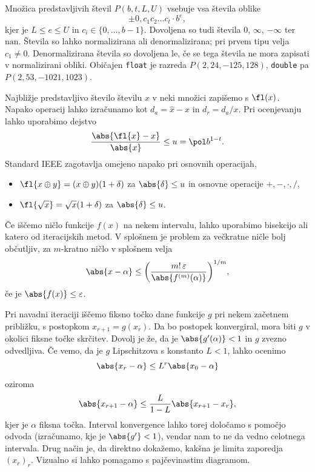 
\newcommand{\nan}{\text{nan}}

Množica predstavljivih števil $P(b, t, L, U)$ vsebuje vsa števila oblike
\[
  \pm 0, c_1 c_2 \ldots c_t \cdot b^e,
\]
kjer je $L \le e \le U$ in $c_i \in \{0, \ldots, b-1\}$.
Dovoljena so tudi števila $0$, $\infty$, $-\infty$ ter $\nan$.
Števila so lahko normalizirana ali denormalizirana; pri prvem tipu velja $c_1
\ne 0$.
Denormalizirana števila so dovoljena le, če se tega števila ne mora zapisati v
normalizirani obliki.
Običajen \verb+float+ je razreda $P(2, 24, -125, 128)$, \verb+double+ pa $P(2,
53, -1021, 1023)$.

Najbližje predstavljivo število številu $x$ v neki množici zapišemo s $\fl(x)$.
Napako operacij lahko izračunamo kot  $d_a = \hat{x} -
x$ in  $d_r = d_a / x$.
Pri ocenjevanju lahko uporabimo dejstvo
\[
  \frac{\abs{\fl{x} - x}}{\abs{x}} \le u = \pol b^{1-t}.
\]
Standard IEEE zagotavlja omejeno napako pri osnovnih operacijah,
\begin{itemize}
\item $\fl{x \oplus y} = (x \oplus y)(1+\delta)$ za $\abs{\delta} \le u$ in
  osnovne operacije $+, -, \cdot, /$,
\item $\fl{\sqrt{x}} = \sqrt{x} (1+\delta)$ za $\abs{\delta} \le u$.
\end{itemize}


Če iščemo ničlo funkcije $f(x)$ na nekem intervalu, lahko uporabimo bisekcijo
ali katero od iteracijskih metod.
V splošnem je problem za večkratne ničle bolj občutljiv, za $m$-kratno ničlo v
splošnem velja
\[
  \abs{x - \alpha} \le {\left( \frac{m!\,\varepsilon}{\abs{f^{(m)}(\alpha)}}
  \right)}^{1/m},
\]
če je $\abs{f(x)} \le \varepsilon$.

Pri navadni iteraciji iščemo fiksno točko dane funkcije $g$ pri nekem začetnem
približku, s postopkom $x_{r+1} = g(x_r)$.
Da bo postopek konvergiral, mora biti $g$ v okolici fiksne točke skrčitev.
Dovolj je že, da je $\abs{g'(\alpha)} < 1$ in $g$ zvezno odvedljiva.
Če vemo, da je $g$ Lipschitzova s konstanto $L < 1$, lahko ocenimo
\[
  \abs{x_r - \alpha} \le L^r \abs{x_0 - \alpha}
\]
oziroma
\[
  \abs{x_{r+1} - \alpha} \le \frac{L}{1 - L} \abs{x_{r+1} - x_r},
\]
kjer je $\alpha$ fiksna točka.
Interval konvergence lahko torej določamo s pomočjo odvoda (izračunamo, kje je
$\abs{g'} < 1$), vendar nam to ne da vedno celotnega intervala.
Drug način je, da direktno dokažemo, kakšna je limita zaporedja $(x_r)_r$.
Vizualno si lahko pomagamo s pajčevinastim diagramom.

